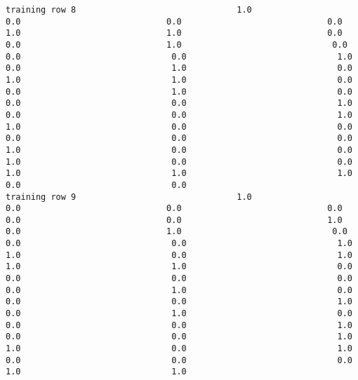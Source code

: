 \documentclass[11pt]{article}
\begin{document}
\begin{verbatim}
training row 8                                1.0                             0.0                             0.0                             0.0                             1.0                             1.0                             0.0                             0.0                             1.0                              0.0                              0.0                              0.0                              1.0                              0.0                              1.0                              0.0                              1.0                              1.0                              0.0                              0.0                              1.0                              0.0                              0.0                              0.0                              1.0                              0.0                              0.0                              1.0                              1.0                              0.0                              0.0                              0.0                              0.0                              0.0                              1.0                              0.0                              0.0                              1.0                              0.0                              0.0                              1.0                              1.0                              1.0                              0.0                              0.0
training row 9                                1.0                             0.0                             0.0                             0.0                             0.0                             0.0                             1.0                             0.0                             1.0                              0.0                              0.0                              0.0                              1.0                              1.0                              0.0                              1.0                              1.0                              1.0                              0.0                              0.0                              0.0                              0.0                              0.0                              1.0                              0.0                              0.0                              0.0                              1.0                              0.0                              1.0                              0.0                              0.0                              0.0                              1.0                              0.0                              0.0                              1.0                              1.0                              0.0                              1.0                              0.0                              0.0                              0.0                              1.0                              1.0

\end{verbatim}
\end{document}

